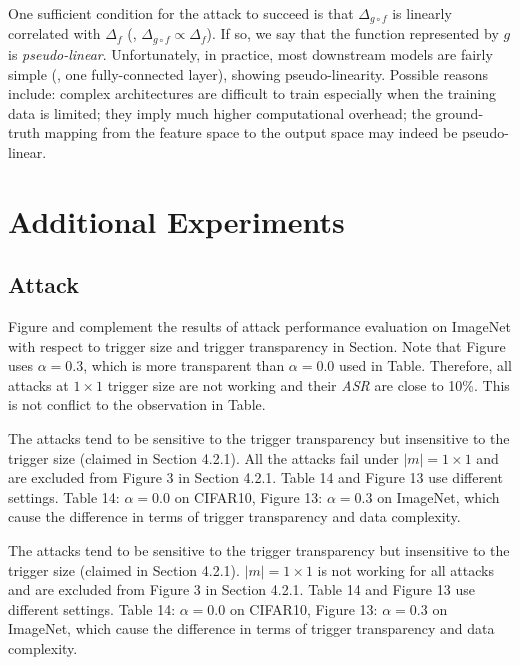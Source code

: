 \documentclass[compsoc,conference,a4paper,10pt,times]{IEEEtran}
\newcommand{\asr}{{\em \small ASR}\xspace}
\begin{document}
One sufficient condition for the attack to succeed is that $\Delta_{g\circ f}$ is linearly correlated with $\Delta_{f}$ (\mie, $\Delta_{g\circ f} \propto \Delta_{f}$). If so, we say that the function represented by $g$ is {\em pseudo-linear}. Unfortunately, in practice, most downstream models are fairly simple (\meg, one fully-connected layer), showing pseudo-linearity. Possible reasons include:  complex architectures are difficult to train especially when the training data is limited;  they imply much higher computational overhead;  the ground-truth mapping from the feature space to the output space may indeed be pseudo-linear.


\section{Additional Experiments}
\label{sec:additional}

\subsection{Attack}

Figure and  complement the results of attack performance evaluation on ImageNet with respect to trigger size and trigger transparency in Section. Note that Figure uses $\alpha=0.3$, which is more transparent than $\alpha=0.0$ used in Table. Therefore, all attacks at $1\times 1$ trigger size are not working and their \asr are close to 10\%. This is not conflict to the observation in Table.

The attacks tend to be sensitive to the trigger transparency but insensitive to the trigger size (claimed in Section 4.2.1). All the attacks fail under $|m|=1\times 1$ and are excluded from Figure 3 in Section 4.2.1. Table 14 and Figure 13 use different settings. Table 14: $\alpha=0.0$ on CIFAR10, Figure 13: $\alpha=0.3$ on ImageNet, which cause the difference in terms of trigger transparency and data complexity.

The attacks tend to be sensitive to the trigger transparency but insensitive to the trigger size (claimed in Section 4.2.1). $|m|=1\times 1$ is not working for all attacks and are excluded from Figure 3 in Section 4.2.1. Table 14 and Figure 13 use different settings. Table 14: $\alpha=0.0$ on CIFAR10, Figure 13: $\alpha=0.3$ on ImageNet, which cause the difference in terms of trigger transparency and data complexity.
\end{document}
